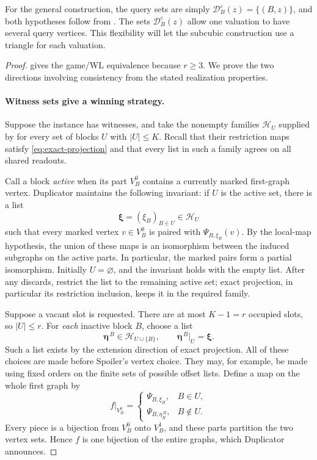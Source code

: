 \documentclass[11pt]{article}
\theoremstyle{definition}
\begin{document}
For the general construction, the query sets are simply
\(\mathcal D_B^\varepsilon(z)=\{(B,z)\}\), and both hypotheses follow from
. The sets \(\mathcal D_B^\varepsilon(z)\)
allow one valuation to have several query vertices. This flexibility
will let the subcubic construction use a triangle for each valuation.

\begin{proof}
 gives the game/WL equivalence because \(r\ge3\).
We prove the two directions involving consistency from the stated
realization properties.

\paragraph{Witness sets give a winning strategy.}
Suppose the instance has witnesses, and take the nonempty families
$\mathcal H_U$ supplied by  for every set of blocks
$U$ with $\left\lvert{U}\right\rvert\leq K$.  Recall that their restriction maps satisfy
\eqref{eq:exact-projection} and that every list in such a family agrees on
all shared readouts.

Call a block \emph{active} when its part $V_B^0$ contains a currently
marked first-graph vertex.  Duplicator maintains the following invariant:
if $U$ is the active set, there is a list
\[
 \boldsymbol\xi=(\xi_B)_{B\in U}\in\mathcal H_U
\]
such that every marked vertex $v\in V_B^0$ is paired with
$\Psi_{B,\xi_B}(v)$.  By the local-map hypothesis, the union of these maps is an isomorphism
between the induced subgraphs on the active parts.  In particular, the marked pairs form a partial isomorphism.
Initially $U=\varnothing$, and the invariant holds with the empty list.
After any discards, restrict the list to the remaining active set; exact
projection, in particular its restriction inclusion, keeps it in the
required family.

Suppose a vacant slot is requested.  There are at most $K-1=r$ occupied
slots, so $\left\lvert{U}\right\rvert\leq r$.  For \emph{each} inactive block $B$, choose a
list
\begin{equation}
\label{uniform:preselected-extension}
 \boldsymbol\eta^{\,B}\in\mathcal H_{U\cup\{B\}},
 \qquad
 \boldsymbol\eta^{\,B}|_U=\boldsymbol\xi.
\end{equation}
Such a list exists by the extension direction of exact projection.
All of these choices are made before Spoiler's vertex choice.  They may,
for example, be made using fixed orders on the finite sets of possible
offset lists.  Define a map on the whole first graph by
\[
 f|_{V_B^0}=
 \begin{cases}
  \Psi_{B,\xi_B},&B\in U,\\
  \Psi_{B,\eta^{\,B}_B},&B\notin U.
 \end{cases}
\]
Every piece is a bijection from $V_B^0$ onto $V_B^1$, and these parts
partition the two vertex sets.  Hence $f$ is one bijection of the entire
graphs, which Duplicator announces.


\end{proof}
\end{document}
